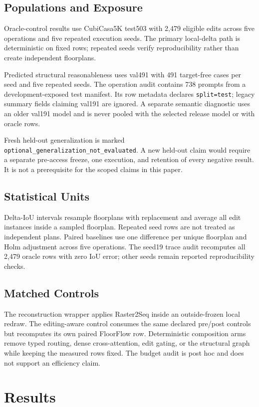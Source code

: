 \documentclass[10pt,twocolumn,letterpaper]{article}
\begin{document}
\subsection{Populations and Exposure}
Oracle-control results use CubiCasa5K test503 with 2,479 eligible edits across
five operations and five repeated execution seeds. The primary local-delta path
is deterministic on fixed rows; repeated seeds verify reproducibility rather than
create independent floorplans.

Predicted structural reasonableness uses val491 with 491 target-free cases per
seed and five repeated seeds. The operation audit contains 738 prompts from a
development-exposed test manifest. Its row metadata declares \texttt{split=test};
legacy summary fields claiming val191 are ignored. A separate semantic diagnostic
uses an older val191 model and is never pooled with the selected release model or
with oracle rows.

Fresh held-out generalization is marked
\texttt{optional\_generalization\_not\_evaluated}. A new held-out claim would
require a separate pre-access freeze, one execution, and retention of every
negative result. It is not a prerequisite for the scoped claims in this paper.

\subsection{Statistical Units}
Delta-IoU intervals resample floorplans with replacement and average all edit
instances inside a sampled floorplan. Repeated seed rows are not treated as
independent plans. Paired baselines use one difference per unique floorplan and
Holm adjustment across five operations. The seed19 trace audit recomputes all
2,479 oracle rows with zero IoU error; other seeds remain reported reproducibility
checks.

\subsection{Matched Controls}
The reconstruction wrapper applies Raster2Seq inside an outside-frozen local
redraw. The editing-aware control consumes the same declared pre/post controls but
recomputes its own paired FloorFlow row. Deterministic composition arms remove
typed routing, dense cross-attention, edit gating, or the structural graph while
keeping the measured rows fixed. The budget audit is post hoc and does not support
an efficiency claim.

\section{Results}
\end{document}
